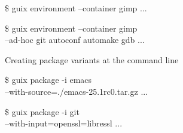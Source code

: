 \documentclass{beamer}
\begin{document}
\begin{frame}[plain]
\end{frame}


\begin{frame}[fragile]
  \begin{semiverbatim}
\$ guix environment --container gimp
\textrm{...}

\$ guix environment --container gimp \\
     --ad-hoc git autoconf automake gdb
\textrm{...}

  \end{semiverbatim}
\end{frame}

\begin{frame}[plain]
  \Huge{Creating package variants at the command line}
\end{frame}

\begin{frame}[fragile]
  \begin{semiverbatim}
\$ guix package -i emacs \\
    \alert<1>{--with-source}=./emacs-25.1rc0.tar.gz
\textrm{...}

\pause
\$ guix package -i git \\
     \alert<2>{--with-input}=openssl=libressl
\textrm{...}

  \end{semiverbatim}
\end{frame}
\end{document}

